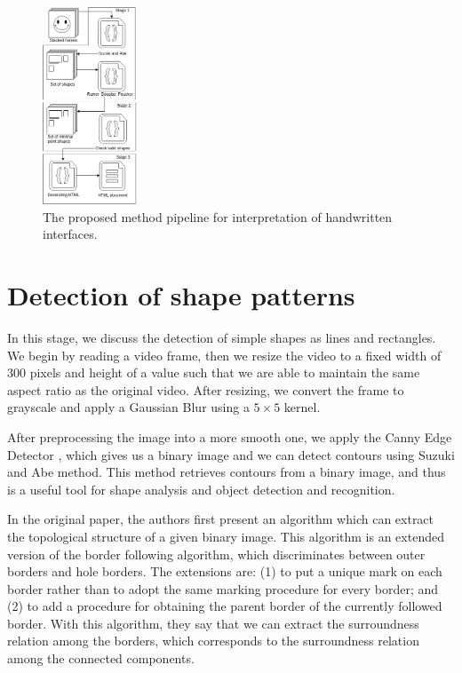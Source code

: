 \documentclass[]{IEEEtran}
\begin{document}
   \begin{figure}[h]
   \centering
   \includegraphics[width=0.25\textwidth]{figures/diagram.png}
   \caption{\label{process} The proposed method pipeline for interpretation of handwritten interfaces.}
  \end{figure}
    
  \section{Detection of shape patterns}
  In this stage, we discuss the detection of simple shapes as lines and rectangles. We begin by reading a video frame, then we resize the video to a fixed width of $300$ pixels and height of a value such that we are able to maintain the same aspect ratio as the original video. After resizing, we convert the frame to grayscale and apply a Gaussian Blur using a $5 \times 5$ kernel.
  
  After preprocessing the image into a more smooth one, we apply the Canny Edge Detector \cite{canny}, which gives us a binary image and we can detect contours using Suzuki and Abe method. This method retrieves contours from a binary image, and thus is a useful tool for shape analysis and object detection and recognition.
  
  In the original paper, the authors first present an algorithm which can extract the topological structure of a given binary image. This algorithm is an extended version of the border following algorithm, which discriminates between outer borders and hole borders. The extensions are: (1) to put a unique mark on each border rather than to adopt the same marking procedure for every border; and (2) to add a procedure for obtaining the parent border of the currently followed border. With this algorithm, they say that we can extract the surroundness relation among the borders, which corresponds to the surroundness relation among the connected components.
  
\end{document}
